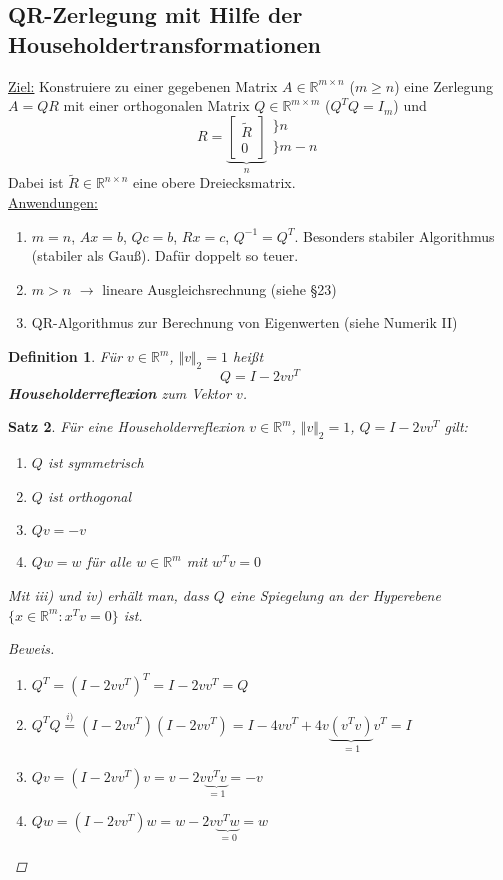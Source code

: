 \documentclass[12pt]{article}
\theoremstyle{break}
\newtheorem{theorem}{Satz}[subsection]
\newtheorem{definition}[theorem]{Definition}
\begin{document}
\subsection{QR-Zerlegung mit Hilfe der Householdertransformationen}
\underline{Ziel:} Konstruiere zu einer gegebenen Matrix $A \in \mathbb{R}^{m \times n}$ ($m \geq n$) eine Zerlegung $A=QR$ mit einer orthogonalen Matrix $Q \in \mathbb{R}^{m \times m}$ ($Q^TQ = I_m$) und 
$$R = \underbrace{\left[ \begin{matrix} \tilde{R} \\ \hline 0\end{matrix} \right]}_{n}\begin{array}{l} \}n \\ \} m-n\end{array}$$
Dabei ist $\tilde{R} \in \mathbb{R}^{n \times n}$ eine obere Dreiecksmatrix.\\
\underline{Anwendungen:}
\renewcommand{\labelenumi}{\alph{enumi})}
\begin{enumerate}
  \item $m=n$, $Ax = b$, $Qc = b$, $Rx=c$, $Q^{-1} = Q^T$. Besonders stabiler Algorithmus (stabiler als Gauß). Dafür doppelt so teuer.
  \item $m>n$ $\rightarrow$ lineare Ausgleichsrechnung (siehe \S 23)
  \item QR-Algorithmus zur Berechnung von Eigenwerten (siehe Numerik II)
\end{enumerate}

\begin{definition}
Für $v \in \mathbb{R}^m$, $\Vert v \Vert_2 = 1$ heißt
$$Q = I - 2 v v^T$$
\textbf{Householderreflexion} zum Vektor $v$.
\end{definition}

\begin{theorem}
Für eine Householderreflexion $v \in \mathbb{R}^m$, $\Vert v \Vert_2 = 1$, $Q = I - 2 v v^T$ gilt:
\renewcommand{\labelenumi}{\roman{enumi})}
\begin{enumerate}
  \item $Q$ ist symmetrisch
  \item $Q$ ist orthogonal
  \item $Qv = -v$
  \item $Qw = w$ für alle $w \in \mathbb{R}^{m}$ mit $w^Tv = 0$
\end{enumerate}
Mit iii) und iv) erhält man, dass $Q$ eine Spiegelung an der Hyperebene $\{x\in \mathbb{R}^m: x^Tv = 0 \}$ ist.
\begin{proof}[Beweis]\leavevmode
\renewcommand{\labelenumi}{\roman{enumi})}
\begin{enumerate}
  \item $Q^T = (I-2vv^T)^T = I-2vv^T = Q$
  \item $Q^TQ \overset{i)}{=} (I-2vv^T)(I-2vv^T) = I - 4 v v^T + 4 v \underbrace{(v^Tv)}_{=1}v^T = I$ 
  \item $Qv = (I-2vv^T)v = v - 2v \underbrace{v^Tv}_{=1} = - v$
  \item $Qw = (I-2vv^T)w = w - 2v\underbrace{v^Tw}_{=0} = w$
\end{enumerate}
\end{proof}
\end{theorem}
\end{document}
